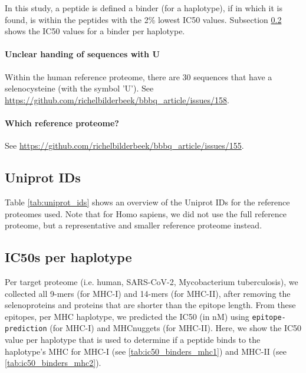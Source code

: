 In this study, a peptide is defined a binder (for a haplotype), 
if  in which it is found, 
is within the peptides with the 2\% lowest IC50 values.
Subsection \ref{subsec:ic50s_per_haplotype} shows the IC50 values
for a binder per haplotype.

\paragraph{Unclear handing of sequences with U}

Within the human reference proteome, there are 30 sequences that have a
selenocysteine (with the symbol 'U').
See \url{https://github.com/richelbilderbeek/bbbq_article/issues/158}.

\paragraph{Which reference proteome?}

See \url{https://github.com/richelbilderbeek/bbbq_article/issues/155}.


\subsection{Uniprot IDs}

Table \ref{tab:uniprot_ids} shows an overview of the Uniprot IDs
for the reference proteomes used. Note that for Homo sapiens,
we did not use the full reference proteome, but a representative
and smaller reference proteome instead.



\subsection{IC50s per haplotype}
\label{subsec:ic50s_per_haplotype}

Per target proteome (i.e. human, SARS-CoV-2, Mycobacterium tuberculosis),
we collected all 9-mers (for MHC-I) and 14-mers (for MHC-II),
after removing the selenoproteins and proteins that are shorter
than the epitope length.
From these epitopes, per MHC haplotype,
we predicted the IC50 (in nM) using \verb;epitope-prediction; (for MHC-I)
and MHCnuggets (for MHC-II). 
Here, we show the IC50 value per haplotype that
is used to determine if a peptide binds to the haplotype's MHC
for MHC-I (see \ref{tab:ic50_binders_mhc1}) and 
MHC-II (see \ref{tab:ic50_binders_mhc2}).

